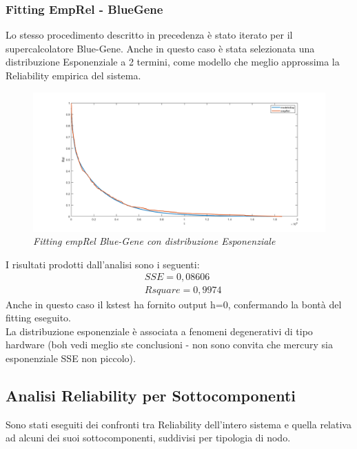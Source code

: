 \subsubsection{Fitting EmpRel - BlueGene}
Lo stesso procedimento descritto in precedenza è stato iterato per il supercalcolatore Blue-Gene. Anche in questo caso è stata selezionata una distribuzione Esponenziale a 2 termini, come modello che meglio approssima la Reliability empirica del sistema.
\begin{figure}[H]
	\centering
	\includegraphics[width=\textwidth]{img/hw6/FittingBG.png}
	\caption{\textit{Fitting empRel Blue-Gene con distribuzione Esponenziale}}
\end{figure}
I risultati prodotti dall'analisi sono i seguenti:
\begin{equation*}
	\begin{split}
		&SSE = 0,08606\\
		&Rsquare = 0,9974
	\end{split}
\end{equation*}
Anche in questo caso il kstest ha fornito output h=0, confermando la bontà del fitting eseguito.
\\
La distribuzione esponenziale è associata a fenomeni degenerativi di tipo hardware (boh vedi meglio ste conclusioni - non sono convita che mercury sia esponenziale SSE non piccolo).
\subsection{Analisi Reliability per Sottocomponenti}
Sono stati eseguiti dei confronti tra Reliability dell'intero sistema e quella relativa ad alcuni dei suoi sottocomponenti, suddivisi per tipologia di nodo. 
